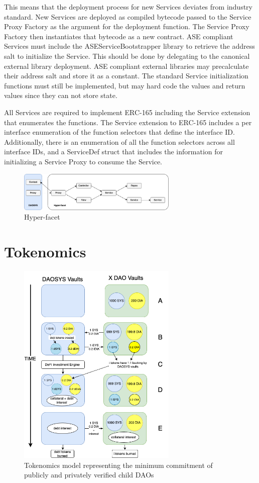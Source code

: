 \documentclass[journal,twocolumn,12pt]{ieeesyscoin}
\begin{document}
This means that the deployment process for new Services deviates from industry standard. New Services are deployed as compiled bytecode passed to the Service Proxy Factory as the argument for the deployment function. The Service Proxy Factory then instantiates that bytecode as a new contract. ASE compliant Services must include the ASEServiceBootstrapper library to retrieve the address salt to initialize the Service. This should be done by delegating to the canonical external library deployment. ASE compliant external libraries may precalculate their address salt and store it as a constant. The standard Service initialization functions must still be implemented, but may hard code the values and return values since they can not store state.

All Services are required to implement ERC-165 including the Service extension that enumerates the functions. The Service extension to ERC-165 includes a per interface enumeration of the function selectors that define the interface ID. Additionally, there is an enumeration of all the function selectors across all interface IDs, and a ServiceDef struct that includes the information for initializing a Service Proxy to consume the Service.

\begin{figure}[h!]
\includegraphics[width=3in]{img/hyper_facet.png}
\caption{Hyper-facet} 
\label{fig:hyper_facet}
\end{figure} 

\section{Tokenomics}
\label{sec:tokenomics}

\lipsum[1]

\begin{figure}[h!]
\includegraphics[width=3in]{img/timeline.png}
\caption{Tokenomics model representing the minimum commitment of publicly and privately verified child DAOs} 
\label{fig:daosys_launch}
\end{figure} 
\end{document}
